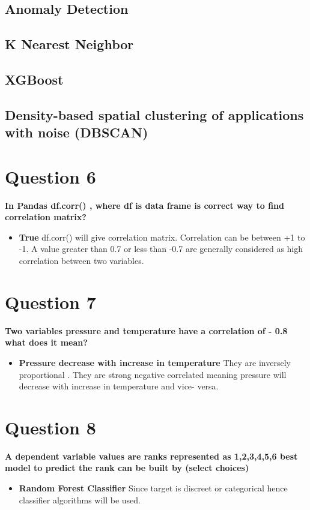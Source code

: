 \documentclass[10pt,letterpaper]{article}
\begin{document}
\subsection{Anomaly Detection}
\subsection{K Nearest Neighbor}
\subsection{XGBoost}
\subsection{Density-based spatial clustering of applications with noise (DBSCAN)}


\section{Question 6}
\textbf{In Pandas df.corr() , where df is data frame is correct way to find correlation matrix?}
\begin{itemize}
\item \textbf{True} df.corr() will give correlation matrix. Correlation can be between +1 to -1. A value greater than 0.7 or less than -0.7 are generally considered as high correlation between two variables.
\end{itemize}

\section{Question 7}
\textbf{Two variables pressure and temperature have a correlation of - 0.8 what does it mean?}
\begin{itemize}
\item \textbf{Pressure decrease with increase in temperature} They are inversely proportional . They are strong negative correlated meaning pressure will decrease with increase in temperature and vice- versa.
\end{itemize}

\section{Question 8}
\textbf{A dependent variable values are ranks represented as 1,2,3,4,5,6  best model to predict the rank can be built by (select choices)}
\begin{itemize}
\item \textbf{Random Forest Classifier} Since target is discreet or categorical hence classifier algorithms will be used.
\end{itemize}
\end{document}
